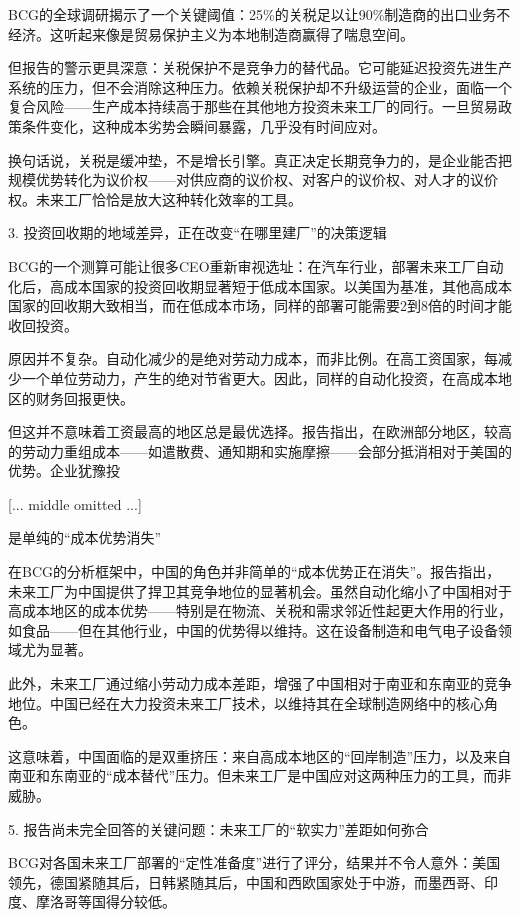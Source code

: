 \documentclass[11pt]{ctexart}
\begin{document}
BCG的全球调研揭示了一个关键阈值：25\%的关税足以让90\%制造商的出口业务不经济。这听起来像是贸易保护主义为本地制造商赢得了喘息空间。

但报告的警示更具深意：关税保护不是竞争力的替代品。它可能延迟投资先进生产系统的压力，但不会消除这种压力。依赖关税保护却不升级运营的企业，面临一个复合风险——生产成本持续高于那些在其他地方投资未来工厂的同行。一旦贸易政策条件变化，这种成本劣势会瞬间暴露，几乎没有时间应对。

换句话说，关税是缓冲垫，不是增长引擎。真正决定长期竞争力的，是企业能否把规模优势转化为议价权——对供应商的议价权、对客户的议价权、对人才的议价权。未来工厂恰恰是放大这种转化效率的工具。

3. 投资回收期的地域差异，正在改变“在哪里建厂”的决策逻辑

BCG的一个测算可能让很多CEO重新审视选址：在汽车行业，部署未来工厂自动化后，高成本国家的投资回收期显著短于低成本国家。以美国为基准，其他高成本国家的回收期大致相当，而在低成本市场，同样的部署可能需要2到8倍的时间才能收回投资。

原因并不复杂。自动化减少的是绝对劳动力成本，而非比例。在高工资国家，每减少一个单位劳动力，产生的绝对节省更大。因此，同样的自动化投资，在高成本地区的财务回报更快。

但这并不意味着工资最高的地区总是最优选择。报告指出，在欧洲部分地区，较高的劳动力重组成本——如遣散费、通知期和实施摩擦——会部分抵消相对于美国的优势。企业犹豫投

[... middle omitted ...]

是单纯的“成本优势消失”

在BCG的分析框架中，中国的角色并非简单的“成本优势正在消失”。报告指出，未来工厂为中国提供了捍卫其竞争地位的显著机会。虽然自动化缩小了中国相对于高成本地区的成本优势——特别是在物流、关税和需求邻近性起更大作用的行业，如食品——但在其他行业，中国的优势得以维持。这在设备制造和电气电子设备领域尤为显著。

此外，未来工厂通过缩小劳动力成本差距，增强了中国相对于南亚和东南亚的竞争地位。中国已经在大力投资未来工厂技术，以维持其在全球制造网络中的核心角色。

这意味着，中国面临的是双重挤压：来自高成本地区的“回岸制造”压力，以及来自南亚和东南亚的“成本替代”压力。但未来工厂是中国应对这两种压力的工具，而非威胁。

5. 报告尚未完全回答的关键问题：未来工厂的“软实力”差距如何弥合

BCG对各国未来工厂部署的“定性准备度”进行了评分，结果并不令人意外：美国领先，德国紧随其后，日韩紧随其后，中国和西欧国家处于中游，而墨西哥、印度、摩洛哥等国得分较低。
\end{document}
